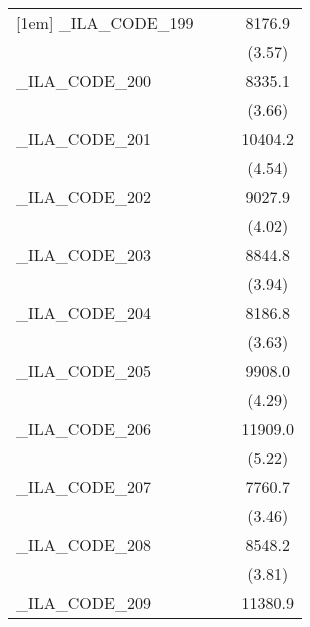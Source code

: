 {\begin{tabular}{l*{3}{c}}
[1em]
\_ILA\_CODE\_199&                     &                     &      8176.9\sym{***}\\
            &                     &                     &      (3.57)         \\
[1em]
\_ILA\_CODE\_200&                     &                     &      8335.1\sym{***}\\
            &                     &                     &      (3.66)         \\
[1em]
\_ILA\_CODE\_201&                     &                     &     10404.2\sym{***}\\
            &                     &                     &      (4.54)         \\
[1em]
\_ILA\_CODE\_202&                     &                     &      9027.9\sym{***}\\
            &                     &                     &      (4.02)         \\
[1em]
\_ILA\_CODE\_203&                     &                     &      8844.8\sym{***}\\
            &                     &                     &      (3.94)         \\
[1em]
\_ILA\_CODE\_204&                     &                     &      8186.8\sym{***}\\
            &                     &                     &      (3.63)         \\
[1em]
\_ILA\_CODE\_205&                     &                     &      9908.0\sym{***}\\
            &                     &                     &      (4.29)         \\
[1em]
\_ILA\_CODE\_206&                     &                     &     11909.0\sym{***}\\
            &                     &                     &      (5.22)         \\
[1em]
\_ILA\_CODE\_207&                     &                     &      7760.7\sym{***}\\
            &                     &                     &      (3.46)         \\
[1em]
\_ILA\_CODE\_208&                     &                     &      8548.2\sym{***}\\
            &                     &                     &      (3.81)         \\
[1em]
\_ILA\_CODE\_209&                     &                     &     11380.9\sym{***}\\

\end{tabular}}
